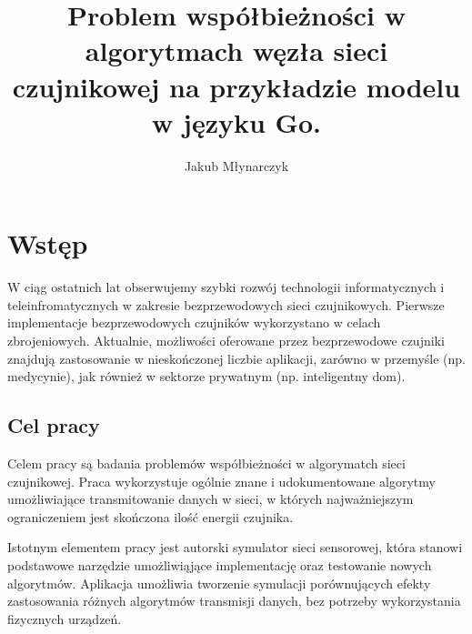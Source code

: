 \documentclass[a4paper,12pt,twoside,openany]{report}
\title{Problem współbieżności w algorytmach węzła sieci czujnikowej na przykładzie modelu w języku Go.}
\author{Jakub Młynarczyk}
\begin{document}
\maketitle

\chapter{Wstęp}

W ciąg ostatnich lat obserwujemy szybki rozwój technologii informatycznych i teleinfromatycznych w zakresie bezprzewodowych sieci czujnikowych.
Pierwsze implementacje bezprzewodowych czujników wykorzystano w celach zbrojeniowych. Aktualnie, możliwości oferowane przez bezprzewodowe 
czujniki znajdują zastosowanie w nieskończonej liczbie aplikacji, zarówno w przemyśle (np. medycynie), jak również w sektorze prywatnym (np. inteligentny dom).


\section{Cel pracy}
Celem pracy są badania problemów współbieżności w algorymatch sieci czujnikowej. Praca wykorzystuje 
ogólnie znane i udokumentowane algorytmy umożliwiające
transmitowanie danych w sieci, w których najważniejszym ograniczeniem jest skończona ilość energii czujnika.

Istotnym elementem pracy jest autorski symulator sieci sensorowej, która stanowi podstawowe narzędzie umożliwiąjące implementację oraz testowanie nowych algorytmów.
Aplikacja umożliwia tworzenie symulacji porównujących efekty zastosowania różnych algorytmów transmisji danych, bez potrzeby wykorzystania fizycznych urządzeń.

\end{document}
